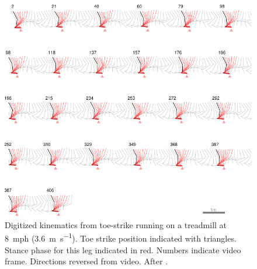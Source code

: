 \begin{figure}[p]
\begin{center}
\includegraphics{data/toe-pretty.pdf}
\end{center}
\caption{Digitized kinematics from toe-strike running on a treadmill at \SI{8}{mph} (\SI{3.6}{\meter\per\second}). Toe strike position indicated with triangles. Stance phase for this leg indicated in red. Numbers indicate video frame. Directions reversed from video. After \citep{marey1873locomotion, muybridge1901human}.}  
\label{fig:results:toepretty}
\end{figure}

